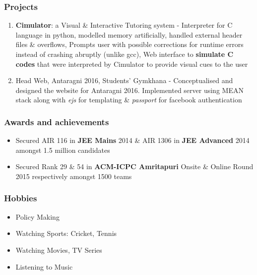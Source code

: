 \documentclass[a4paper,10pt]{article}
\begin{document}
\subsubsection*{Projects}
\begin{enumerate}
    \item \textbf{Cimulator}: a Visual \& Interactive Tutoring system - Interpreter for C language in python, modelled memory artificially, handled external header files \& overflows, Prompts user with possible corrections for runtime errors instead of crashing abruptly (unlike gcc), Web interface to \textbf{simulate C codes} that were interpreted by Cimulator to provide visual cues to the user
    \item Head Web, Antaragni 2016, Students' Gymkhana - Conceptualised and designed the website for Antaragni 2016. Implemented server using MEAN stack along with \textit{ejs} for templating \& \textit{passport} for facebook authentication
\end{enumerate}

\subsubsection*{Awards and achievements}

\renewcommand{\labelitemi}{$\textendash$}
\begin{itemize}
    \item Secured AIR 116 in \textbf{JEE Mains} 2014 \& AIR 1306 in \textbf{JEE Advanced} 2014 amongst 1.5 million candidates
    \item Secured Rank 29 \& 54 in \textbf{ACM-ICPC Amritapuri} Onsite \& Online Round 2015 respectively amongst 1500 teams
    \vspace{-5pt}
\end{itemize}

\subsubsection*{Hobbies}
\renewcommand{\labelitemi}{$\textendash$}
\begin{itemize}
    \item Policy Making
    \item Watching Sports: Cricket, Tennis
    \item Watching Movies, TV Series
    \item Listening to Music
\end{itemize}
\end{document}
